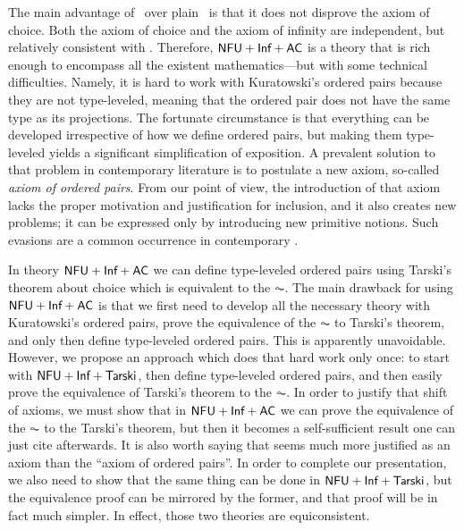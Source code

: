 \documentclass[bsl,meeting]{asl}
\newcommand{\NP}{}
\begin{document}
\thispagestyle{empty}


\NP  
{}

The main advantage of \NFU\ over plain \NF\ is that it does not disprove the axiom of choice. Both the axiom of choice and the axiom of infinity are independent, but relatively consistent with \NFU. Therefore, $\textsf{NFU}+\textsf{Inf}+\textsf{AC}$ is a theory that is rich enough to encompass all the existent mathematics---but with some technical difficulties. Namely, it is hard to work with Kuratowski's ordered pairs because they are not type-leveled, meaning that the ordered pair does not have the same type as its projections. The fortunate circumstance is that everything can be developed irrespective of how we define ordered pairs, but making them type-leveled yields a significant simplification of exposition. A prevalent solution to that problem in contemporary literature is to postulate a new axiom, so-called \emph{axiom of ordered pairs}. From our point of view, the introduction of that axiom lacks the proper motivation and justification for inclusion, and it also creates new problems; it can be expressed only by introducing new primitive notions. Such evasions are a common occurrence in contemporary \NFU.
    
    In theory $\textsf{NFU}+\textsf{Inf}+\textsf{AC}$ we can define type-leveled ordered pairs using Tarski's theorem about choice which is equivalent to the $\AC$. The main drawback for using $\textsf{NFU}+\textsf{Inf}+\textsf{AC}$ is that we first need to develop all the necessary theory with Kuratowski's ordered pairs, prove the equivalence of the $\AC$ to Tarski's theorem, and only then define type-leveled ordered pairs. This is apparently unavoidable. However, we propose an approach which does that hard work only once: to start with $\textsf{NFU}+\textsf{Inf}+\textsf{Tarski}$, then define type-leveled ordered pairs, and then easily prove the equivalence of Tarski's theorem to the $\AC$. In order to justify that shift of axioms, we must show that in $\textsf{NFU}+\textsf{Inf}+\textsf{AC}$ we can prove the equivalence of the $\AC$ to the Tarski's theorem, but then it becomes a self-sufficient result one can just cite afterwards. It is also worth saying that \Tarski{} seems much more justified as an axiom than the ``axiom of ordered pairs''. In order to complete our presentation, we also need to show that the same thing can be done in $\textsf{NFU}+\textsf{Inf}+\textsf{Tarski}$, but the equivalence proof can be mirrored by the former, and that proof will be in fact much simpler. In effect, those two theories are equiconsistent.
\end{document}
